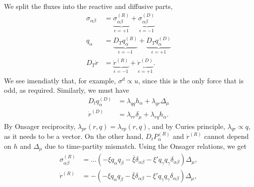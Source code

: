 We split the fluxes into the reactive and diffusive parts, 
%
\begin{align}
    \sigma_{\alpha \beta} 
    & = \underbrace{\sigma_{\alpha \beta}^{(R)}}_{\epsilon=+1}
    + \underbrace{\sigma_{\alpha \beta}^{(D)}}_{\epsilon=-1}\\
    q_\alpha
    & = \underbrace{D_T q_\alpha^{(R)}}_{\epsilon=-1}
    + \underbrace{D_T q_\alpha^{(D)}}_{\epsilon=+1}\\
    D_T \dot r
    & = \underbrace{\dot r^{(R)}}_{\epsilon=-1}
    + \underbrace{\dot r^{(D)}}_{\epsilon=+1}.
\end{align}
%
We see imendiatly that, for example, $\sigma^{d} \propto u$, since this is the only force that is odd, as required.
Similarly, we must have
%
\begin{align}
    D_t q_\alpha^{(D)} &= \lambda_{qq} h_\alpha + \lambda_{qr} \Delta_\mu \\
    \dot r^{(D)} &= \lambda_{rr} \delta_\mu + \lambda_{rq} h_\alpha.
\end{align}
%
By Onsager reciprocity, $\lambda_{pr}(r, q) = \lambda_{rp}(r, q)$, and by Curies principle, $\lambda_{q r} \propto q$, as it needs to be a vector.
On the other hand, $D_t P_\alpha^{(R)}$ and $\dot r^{(R)}$ cannot depend on $h$ and $\Delta_\mu$ due to time-partity mismatch.
Using the Onsager relations, we get
%
\begin{align}
    \sigma_{\alpha \beta}^{(R)} 
    &= \dots
    \left(- \xi q_\alpha q_\beta - \bar \xi \delta_{\alpha \beta} - \xi' q_\gamma q_\gamma \delta_{\alpha \beta}\right)
    \Delta_\mu, \\
    \dot r^{(R)} 
    &= -
    \left(- \xi q_\alpha q_\beta - \bar \xi \delta_{\alpha \beta} - \xi' q_\gamma q_\gamma \delta_{\alpha \beta}\right)
    \Delta_\mu, \\
\end{align}
%
